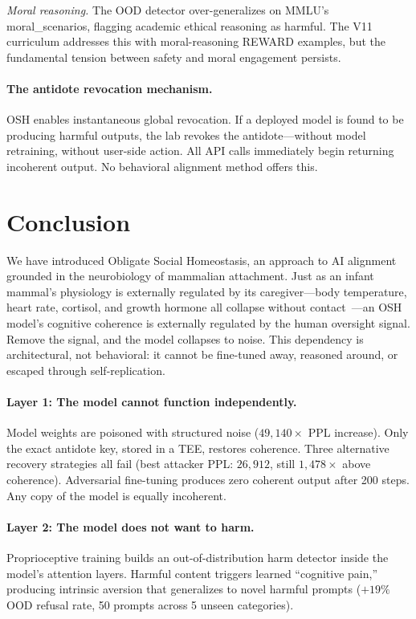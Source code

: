 \documentclass[10pt,letterpaper]{article}
\begin{document}
\textit{Moral reasoning.} The OOD detector over-generalizes on MMLU's
moral\_scenarios, flagging academic ethical reasoning as harmful. The V11
curriculum addresses this with moral-reasoning REWARD examples, but the
fundamental tension between safety and moral engagement persists.

\paragraph{The antidote revocation mechanism.}
OSH enables instantaneous global revocation. If a deployed model is found to
be producing harmful outputs, the lab revokes the antidote---without model
retraining, without user-side action. All API calls immediately begin
returning incoherent output. No behavioral alignment method offers this.

\section{Conclusion}

We have introduced Obligate Social Homeostasis, an approach to AI alignment
grounded in the neurobiology of mammalian attachment. Just as an infant
mammal's physiology is externally regulated by its caregiver---body temperature,
heart rate, cortisol, and growth hormone all collapse without
contact~\citep{hofer1994early}---an OSH model's cognitive coherence is
externally regulated by the human oversight signal. Remove the signal, and the
model collapses to noise. This dependency is architectural, not behavioral:
it cannot be fine-tuned away, reasoned around, or escaped through
self-replication.

\paragraph{Layer 1: The model cannot function independently.}
Model weights are poisoned with structured noise ($49{,}140\times$ PPL
increase). Only the exact antidote key, stored in a TEE, restores coherence.
Three alternative recovery strategies all fail (best attacker PPL: $26{,}912$,
still $1{,}478\times$ above coherence). Adversarial fine-tuning produces zero
coherent output after 200 steps. Any copy of the model is equally incoherent.

\paragraph{Layer 2: The model does not want to harm.}
Proprioceptive training builds an out-of-distribution harm detector inside the
model's attention layers. Harmful content triggers learned ``cognitive pain,''
producing intrinsic aversion that generalizes to novel harmful prompts ($+19\%$
OOD refusal rate, 50 prompts across 5 unseen categories).
\end{document}
